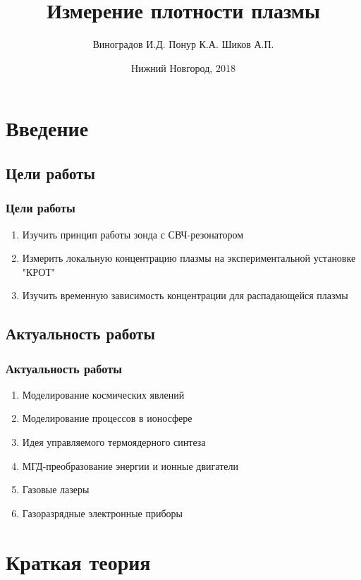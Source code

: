 \documentclass[10pt,pdf,hyperref={unicode}, dvipsnames]{beamer}
\title[Измерение плотности плазмы]{Измерение плотности плазмы}
\author{%
	Виноградов И.Д. %
	Понур К.А. %
	Шиков А.П. %
}
\institute{Радиофизический факультет ННГУ, 430 группа}
\date{Нижний Новгород, 2018}
\begin{document}
  
\begin{frame}
\titlepage
\end{frame}
\begin{frame}
\tableofcontents
\end{frame}
\section{Введение}
\subsection{Цели работы}
\begin{frame}[t]
	\frametitle{Цели работы}
		\vfill
		\begin{enumerate}
			\item Изучить принцип работы зонда с СВЧ-резонатором

			\item Измерить локальную концентрацию плазмы на экспериментальной установке "КРОТ"

			\item Изучить временную зависимость концентрации для распадающейся плазмы  

		\end{enumerate}
		\vfill
\end{frame}
\subsection{Актуальность работы}
\begin{frame}[t]
	
	\frametitle{Актуальность работы}
		
		\begin{enumerate}
			\item Моделирование космических явлений
			\item Моделирование процессов в ионосфере
			\item Идея управляемого термоядерного синтеза
			\item МГД-преобразование энергии и ионные двигатели
			\item Газовые лазеры
			\item Газоразрядные электронные приборы 
		\end{enumerate}


\end{frame}

\section{Краткая теория}
\end{document}
